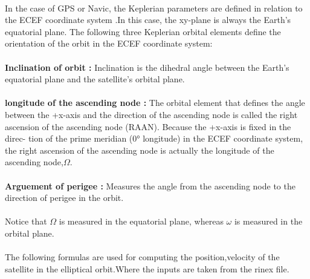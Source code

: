 \documentclass[journal,15pt,onecolumn]{IEEEtran}
\begin{document}
 \\
 In the case of GPS or Navic, the Keplerian
parameters are defined in relation to the ECEF coordinate system .In this case, the xy-plane is always the Earth's equatorial plane.
The following three Keplerian orbital elements define the orientation of the orbit in the
ECEF coordinate system:\\
\\
\textbf{Inclination of orbit :} Inclination is the dihedral angle between the Earth’s equatorial plane and the
satellite’s orbital plane.\\
\\
\textbf{longitude of the ascending node :} The orbital element that defines the
angle between the +x-axis and the direction of the ascending node is called the right
ascension of the ascending node (RAAN). Because the +x-axis is fixed in the direc-
tion of the prime meridian (0° longitude) in the ECEF coordinate system, the right
ascension of the ascending node is actually the longitude of the ascending node,$\Omega$.\\
\\
\textbf{Arguement of perigee :} Measures the angle
from the ascending node to the direction of perigee in the orbit. \\
\\
Notice that $\Omega$ is measured in the equatorial plane, whereas $\omega$ is measured in the orbital plane.
\\
\\
The following formulas are used for computing the position,velocity of the satellite in the elliptical orbit.Where the inputs are taken from the rinex file.\\
\end{document}
